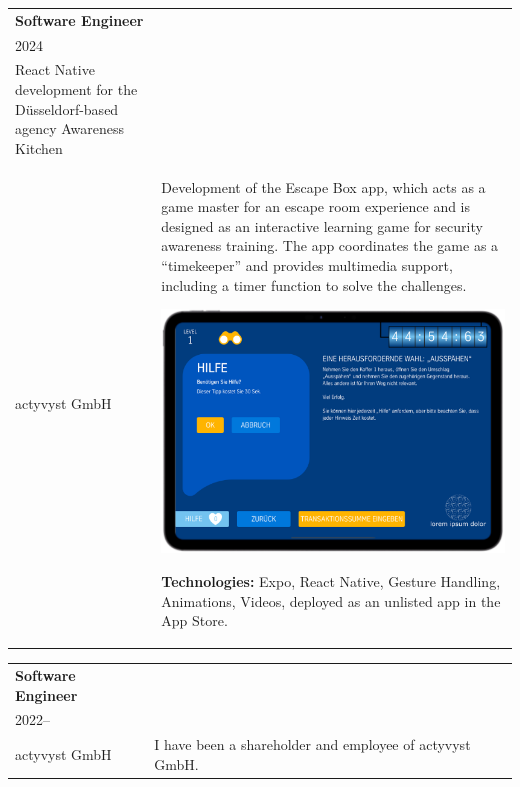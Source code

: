\documentclass[a4paper,10pt]{article}
\begin{document}
\vspace{1em}
\noindent{\color{sectionblue}\rule{\textwidth}{0.4pt}}
\vspace{1em}

\begin{tabularx}{\textwidth}{>{\raggedright}p{4.5cm}X}
  \textbf{\color{sectionblue}Software Engineer}                              \\
  {\color{sectiongray}2024}                                                  \\
  \vspace{1.5em}
  React Native development for the Düsseldorf-based agency Awareness Kitchen \\
  {\color{sectiongray}actyvyst GmbH}
   &
  Development of the Escape Box app, which acts as a game master for an escape room experience and is designed as an interactive learning game for security awareness training. The app coordinates the game as a “timekeeper” and provides multimedia support, including a timer function to solve the challenges.
  \begin{center}
    \includegraphics[width=0.8\linewidth]{assets/awareness-kitchen.png}
  \end{center}
  \textbf{Technologies:} Expo, React Native, Gesture Handling, Animations, Videos, deployed as an unlisted app in the App Store.
\end{tabularx}

\vspace{1em}
\noindent{\color{sectionblue}\rule{\textwidth}{0.4pt}}
\vspace{1em}

\begin{tabularx}{\textwidth}{>{\raggedright}p{4.5cm}X}
  \textbf{\color{sectionblue}Software Engineer} \\
  {\color{sectiongray}2022–}                    \\
  \vspace{1.5em}
  actyvyst GmbH
   &
  I have been a shareholder and employee of actyvyst GmbH.
\end{tabularx}
\end{document}
